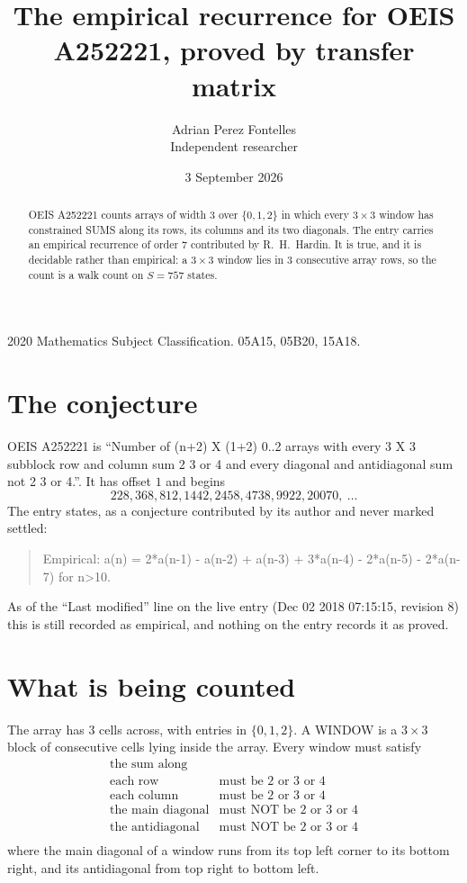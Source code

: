 \documentclass[11pt,a4paper]{article}
\title{The empirical recurrence for OEIS A252221, proved by transfer matrix}
\author{Adrian Perez Fontelles\\ \small Independent researcher}
\date{3 September 2026}
\theoremstyle{plain}
\theoremstyle{definition}
\begin{document}
\maketitle

\begin{abstract}
OEIS A252221 counts arrays of width $3$ over $\{0,1,2\}$ in which every $3\times3$ window has
constrained SUMS along its rows, its columns and its two diagonals. The entry carries an
empirical recurrence of order $7$ contributed by R.~H.~Hardin. It is true, and it is
decidable rather than empirical: a $3\times3$ window lies in $3$ consecutive array rows,
so the count is a walk count on $S=757$ states.
\end{abstract}

\noindent\small 2020 Mathematics Subject Classification. 05A15, 05B20, 15A18.\normalsize

\section{The conjecture}

OEIS A252221 is ``Number of (n+2) X (1+2) 0..2 arrays with every 3 X 3 subblock row and column sum 2 3 or 4 and every diagonal and antidiagonal sum not 2 3 or 4.''. It has offset $1$ and begins
\[
228, 368, 812, 1442, 2458, 4738, 9922, 20070,\ \dots
\]
The entry states, as a conjecture contributed by its author and never marked settled:
\begin{quote}
Empirical: a(n) = 2*a(n-1) - a(n-2) + a(n-3) + 3*a(n-4) - 2*a(n-5) - 2*a(n-7) for n>10.
\end{quote}
As of the ``Last modified'' line on the live entry (Dec 02 2018 07:15:15, revision 8) this is still
recorded as empirical, and nothing on the entry records it as proved.

\section{What is being counted}

The array has $3$ cells across, with entries in $\{0,1,2\}$. A WINDOW is a $3\times3$ block
of consecutive cells lying inside the array. Every window must satisfy
\[
\begin{array}{ll}
\text{the sum along} & \text{} \\[2pt]
\text{each row} & \text{must be 2 or 3 or 4} \\
\text{each column} & \text{must be 2 or 3 or 4} \\
\text{the main diagonal} & \text{must NOT be 2 or 3 or 4} \\
\text{the antidiagonal} & \text{must NOT be 2 or 3 or 4} \\
\end{array}
\]
where the main diagonal of a window runs from its top left corner to its bottom right, and its
antidiagonal from top right to bottom left.
\end{document}
